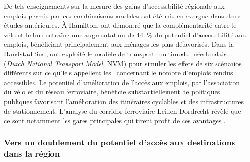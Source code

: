 \begin{refsegment}
De tels enseignements sur la mesure des gains d'accessibilité régionale aux emplois permis par ces combinaisons modales ont été mis en exergue dans deux études antérieures. À Hamilton, \textcolor{blue}{\textcite[10]{zuo_first-and-last_2020}} ont démontré que la complémentarité entre le vélo et le bus entraîne une augmentation de 44~\% du potentiel d'accessibilité aux emplois, bénéficiant principalement aux ménages les plus défavorisés. Dans la Randstad Sud, \textcolor{blue}{\textcite[4-7]{geurs_multi-modal_2016}} ont exploité le modèle de transport multimodal néerlandais (\textsl{Dutch National Transport Model}, NVM) pour simuler les effets de six scénarios différents sur ce qu'iels appellent les ~concernant le nombre d'emplois rendus accessibles. Le potentiel d'amélioration de l'accès aux emplois, par l'association du vélo et du réseau ferroviaire, bénéficie substantiellement de politiques publiques favorisant l'amélioration des itinéraires cyclables et des infrastructures de stationnement. L'analyse du corridor ferroviaire Leiden-Dordrecht révèle que ce sont notamment les gares principales qui tirent profit de ces avantages \textcolor{blue}{\autocite[11]{geurs_multi-modal_2016}}.%

\subsubsection*{Vers un doublement du potentiel d'accès aux destinations dans la région
    \label{chap5:potentiel-accessibilite-destinations}
    }


\end{refsegment}
